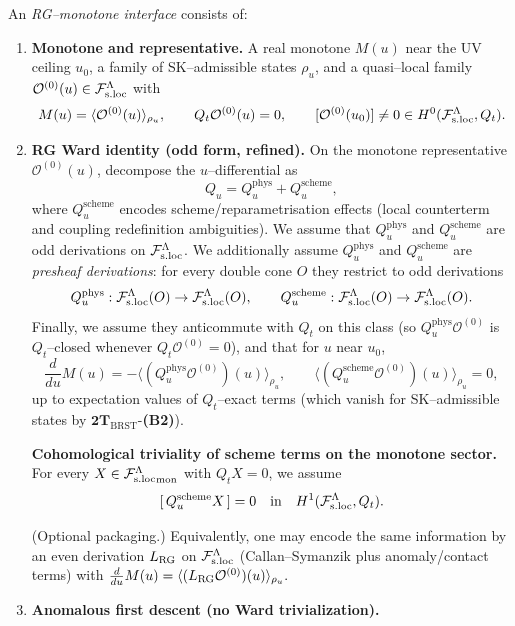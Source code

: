 \begin{definition}
\label{def:2T-RG}
An \emph{RG--monotone interface} consists of:
\begin{enumerate}[label=\textbf{(M\arabic*)},leftmargin=*,itemsep=0.5em]
\item \textbf{Monotone and representative.} A real monotone $M(u)$ near the UV
  ceiling $u_0$, a family of SK--admissible states $\rho_u$, and a quasi--local
  family $\mathcal O^{(0)}(u)\in\mathcal F_{\mathrm{s.loc}}^\Lambda$ with
  \[
  M(u)=\langle \mathcal O^{(0)}(u)\rangle_{\rho_u},
  \qquad
  Q_t\mathcal O^{(0)}(u)=0,
  \qquad
  [\mathcal O^{(0)}(u_0)]\neq 0\in H^0(\mathcal F_{\mathrm{s.loc}}^\Lambda,Q_t).
  \]
\item \textbf{RG Ward identity (odd form, refined).} On the monotone representative
  $\mathcal O^{(0)}(u)$, decompose the $u$--differential as
  \[
  Q_u = Q_u^{\mathrm{phys}} + Q_u^{\mathrm{scheme}},
  \]
  where $Q_u^{\mathrm{scheme}}$ encodes scheme/reparametrisation effects
  (local counterterm and coupling redefinition ambiguities). We assume that
  $Q_u^{\mathrm{phys}}$ and $Q_u^{\mathrm{scheme}}$ are odd derivations
  on $\mathcal F_{\mathrm{s.loc}}^\Lambda$.
  We additionally assume $Q_u^{\mathrm{phys}}$ and $Q_u^{\mathrm{scheme}}$ are
  \emph{presheaf derivations}: for every double cone $O$ they restrict to odd
  derivations
  \[
  Q_u^{\mathrm{phys}}:\mathcal F_{\mathrm{s.loc}}^\Lambda(O)\to\mathcal F_{\mathrm{s.loc}}^\Lambda(O),\qquad
  Q_u^{\mathrm{scheme}}:\mathcal F_{\mathrm{s.loc}}^\Lambda(O)\to\mathcal F_{\mathrm{s.loc}}^\Lambda(O).
  \]
  Finally, we assume they anticommute with $Q_t$ on this class (so
  $Q_u^{\mathrm{phys}}\mathcal O^{(0)}$ is $Q_t$--closed whenever
  $Q_t\mathcal O^{(0)}=0$), and that for $u$ near $u_0$,
  \[
  \frac{d}{du}M(u)
  = -\big\langle (Q_u^{\mathrm{phys}}\mathcal O^{(0)})(u)\big\rangle_{\rho_u},
  \qquad
  \big\langle (Q_u^{\mathrm{scheme}}\mathcal O^{(0)})(u)\big\rangle_{\rho_u}=0,
  \]
  up to expectation values of $Q_t$--exact terms (which vanish for
  SK--admissible states by $\mathbf{2T}_{\mathrm{BRST}}$-\textbf{(B2)}).
\par
  \textbf{Cohomological triviality of scheme terms on the monotone sector.}
  For every $X\in{\mathcal F_{\mathrm{s.loc}}^\Lambda}_{\mathrm{mon}}$ with $Q_tX=0$, we assume
  \[
  [\,Q_u^{\mathrm{scheme}}X\,]=0\quad\text{in}\quad H^1(\mathcal F_{\mathrm{s.loc}}^\Lambda,Q_t).
  \]
\par
  (Optional packaging.) Equivalently, one may encode the same information by an
  even derivation $L_{\rm RG}$ on $\mathcal F_{\mathrm{s.loc}}^\Lambda$ (Callan--Symanzik plus anomaly/contact
  terms) with
  $
  \tfrac{d}{du}M(u)=\langle (L_{\rm RG}\mathcal O^{(0)})(u)\rangle_{\rho_u}.
  $
\item \textbf{Anomalous first descent (no Ward trivialization).}

\end{enumerate}
\end{definition}
